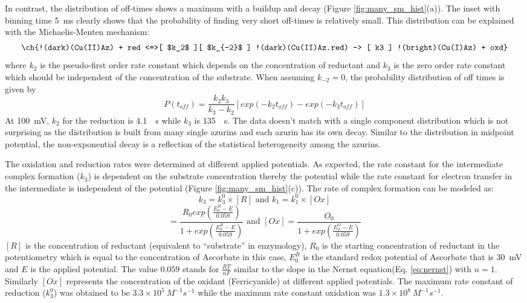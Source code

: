 \documentclass[journal=jacsat,manuscript=article]{achemso}
\begin{document}
In contrast, the distribution of off-times shows a maximum with a buildup and decay (Figure \ref{fig:many_sm_hist}(a)).
The inset with binning time \SI{5}{\ms} clearly shows that the probability of finding very short off-times is relatively small.
This distribution can be explained with the Michaelis-Menten mechanism:
\begin{align}
	\ch{!(dark)(Cu(II)Az) + red <=>[ $k_2$ ][ $k_{-2}$ ] !(dark)(Cu(II)Az.red) -> [ k3 ] !(bright)(Cu(I)Az) + oxd}
	\label{eq:reduction}
\end{align}
where $k_2$ is the pseudo-first order rate constant which depends on the concentration of reductant and $k_3$ is the zero order rate constant which should be independent of the concentration of the substrate.
When assuming $k_{-2}=0$, the probability distribution of off times is given by\cite{lu1998single-molecule}
\begin{equation}
	P(t_{off}) = \frac{k_2k_3}{k_3-k_2} [exp(-k_2t_{off})-exp(-k_3t_{off})]
	\label{eq:2exp_risetime}
\end{equation}
At \SI{100}{\mV}, $k_2$ for the reduction is \SI{4.1}{\per\s} while $k_3$ is \SI{135}{\per\s}.
The data doesn't match with a single component distribution which is not surprising as the distribution is built from many single azurins and each azurin has its own decay.
Similar to the distribution in midpoint potential, the non-exponential decay is a reflection of the statistical heterogeneity among the azurins.

The oxidation and reduction rates were determined at different applied potentials.
As expected, the rate constant for the intermediate complex formation ($k_3$) is dependent on the substrate concentration thereby the potential while the rate constant for electron transfer in the intermediate is independent of the potential (Figure \ref{fig:many_sm_hist}(c)).
The rate of complex formation can be modeled as:
\begin{equation}
	k_3 =k_3^0\times[R] \text{ and } k_1 =k_1^0\times[Ox]
	\label{eq:rate_complex}
\end{equation}
\begin{equation}
	[R] = \frac{R_0exp(\frac{E_0^R-E}{0.059})}{1+exp(\frac{E_0^R-E}{0.059})}
	\text{ and } [Ox] = \frac{O_0}{1+exp(\frac{E_0^O-E}{0.059})}
	\label{eq:conc_potential}
\end{equation}
$[R]$ is the concentration of reductant (equivalent to ``substrate'' in enzymology), $R_0$ is the starting concentration of reductant in the potentiometry which is equal to the concentration of Ascorbate in this case, $E_0^R$ is the standard redox potential of Ascorbate that is \SI{30}{\mV} and $E$ is the applied potential. The value $0.059$ stands for $\frac{RT}{nF}$ similar to the slope in the Nernst equation(Eq. \ref{eq:nernst}) with $n=1$.
Similarly $[Ox]$ represents the concentration of the oxidant (Ferricyanide) at different applied potentials.
The maximum rate constant of reduction ($k_3^0$) was obtained to be $3.3\times10^5~M^{-1}s^{-1}$ while the maximum rate constant oxidation was $1.3\times10^8~M^{-1}s^{-1}$.
\end{document}
